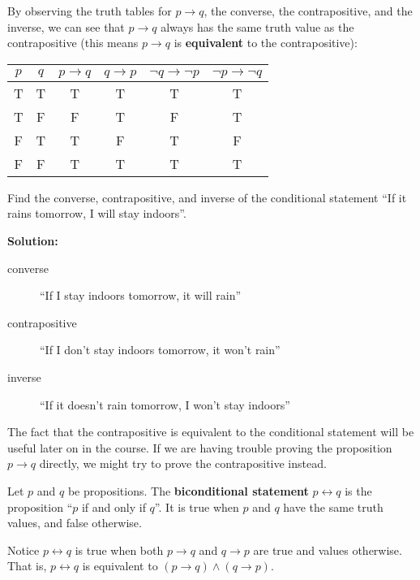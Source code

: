By observing the truth tables for $p\rightarrow q$, the converse, the
contrapositive, and the inverse, we can see that $p\rightarrow q$ always
has the same truth value as the contrapositive (this means $p\rightarrow q$
is \textbf{equivalent} to the contrapositive):

\begin{table}[h] \centering
  \begin{tabular}{cc|c|c|c|c}
    $p$ & $q$ & $p\rightarrow q$ & $q\rightarrow p$
    & $\neg q\rightarrow\neg p$ & $\neg p\rightarrow\neg q$ \\ \hline
    T & T & T & T & T & T \\
    T & F & F & T & F & T \\
    F & T & T & F & T & F \\
    F & F & T & T & T & T
  \end{tabular}
\end{table}

\example Find the converse, contrapositive, and inverse of the
conditional statement ``If it rains tomorrow, I will stay indoors''.

\vspace{0cm}
\textbf{Solution:}
\begin{description}
    \item[converse] ``If I stay indoors tomorrow, it will rain''
    \item[contrapositive] ``If I don't stay indoors tomorrow, it won't rain''
    \item[inverse] ``If it doesn't rain tomorrow, I won't stay indoors''
\end{description}

The fact that the contrapositive is equivalent to the conditional
statement will be useful later on in the course. If we are having
trouble proving the proposition $p\rightarrow q$ directly, we might
try to prove the contrapositive instead.

\begin{defn}
  Let $p$ and $q$ be propositions. The \textbf{biconditional statement}
  $p\leftrightarrow q$ is the proposition ``$p$ if and only if $q$''. It is
  true when $p$ and $q$ have the same truth values, and false otherwise.
\end{defn}

Notice $p\leftrightarrow q$ is true when both $p\rightarrow q$ and
$q\rightarrow p$ are true and values otherwise. That is,
$p\leftrightarrow q$ is equivalent to
$(p\rightarrow q)\wedge(q\rightarrow p)$.

